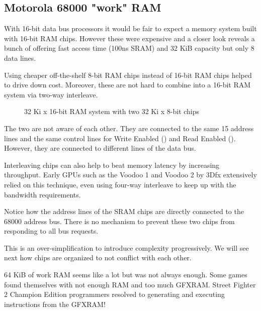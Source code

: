 \subsection{Motorola 68000 "work" RAM}
With 16-bit data bus processors it would be fair to expect a memory system built with 16-bit RAM chips. However these were expensive and a closer look reveals a bunch of  offering fast access time (100ns SRAM) and 32 KiB capacity but only 8 data lines.

\pagebreak

Using cheaper off-the-shelf 8-bit RAM chips instead of 16-bit RAM chips helped to drive down cost. Moreover, these are not hard to combine into a 16-bit RAM system via two-way interleave.

\begin{figure}[H]
\caption*{32 Ki x 16-bit RAM system with two 32 Ki x 8-bit chips}
\end{figure}

The two  are not aware of each other. They are connected to the same 15 address lines and the same control lines for Write Enabled () and Read Enabled (). However, they are connected to different lines of the data bus.


 \begin{trivia}
Interleaving chips can also help to beat memory latency by increasing throughput. Early GPUs such as the Voodoo 1 and Voodoo 2 by 3Dfx extensively relied on this technique, even using four-way interleave to keep up with the bandwidth requirements\cite{TheStoryOf3Dfx}.  
 \end{trivia}


Notice how the address lines of the SRAM chips are directly connected to the 68000 address bus. There is no mechanism to prevent these two chips from responding to all bus requests. 

This is an over-simplification to introduce complexity progressively. We will see next how chips are organized to not conflict with each other.

 \begin{trivia}
 64 KiB of work RAM seems like a lot but was not always enough. Some games found themselves with not enough RAM and too much GFXRAM. Street Fighter 2 Champion Edition programmers resolved to generating and executing instructions from the GFXRAM\cite{mame_driver}!
 \end{trivia}
\pagebreak








